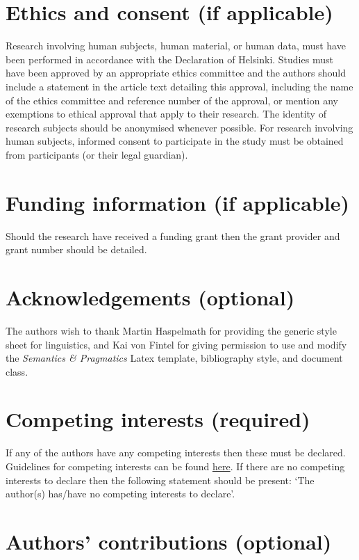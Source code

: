 \documentclass[charis,linguex]{glossa}
\begin{document}
\section*{Ethics and consent (if applicable)}

Research involving human subjects, human material, or human data, must have been performed in accordance with the Declaration of Helsinki. Studies must have been approved by an appropriate ethics committee and the authors should include a statement in the article text detailing this approval, including the name of the ethics committee and reference number of the approval, or mention any exemptions to ethical approval that apply to their research. The identity of research subjects should be anonymised whenever possible. For research involving human subjects, informed consent to participate in the study must be obtained from participants (or their legal guardian).


\section*{Funding information (if applicable)}

Should the research have received a funding grant then the grant provider and grant number should be detailed.

\section*{Acknowledgements (optional)}

The authors wish to thank Martin Haspelmath for providing the generic style sheet for linguistics, and Kai von Fintel for giving permission to use and modify the \textit{Semantics \& Pragmatics} Latex template, bibliography style, and document class.

\section*{Competing interests (required)}

If any of the authors have any competing interests then these must be declared. Guidelines for competing interests can be found \href{https://www.glossa-journal.org/site/competing-interests/}{here}. If there are no competing interests to declare then the following statement should be present: `The author(s) has/have no competing interests to declare'.

\section*{Authors' contributions (optional)}\label{contrib}
\end{document}
